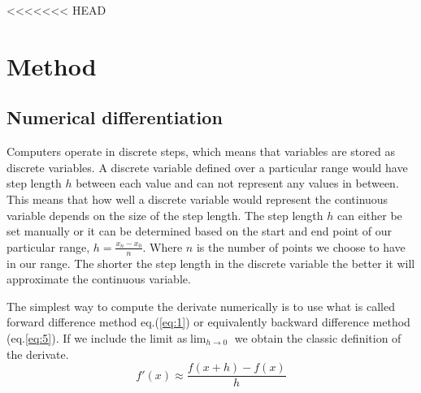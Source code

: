 <<<<<<< HEAD
\section*{Method}
\subsection*{Numerical differentiation}
\par Computers operate in discrete steps, which means that variables are stored
as discrete variables. A discrete variable defined over a particular range would
have step length $h$ between each value and can not represent any values in
between. This means that how well a discrete variable would represent the
continuous variable depends on the size of the step length. The step length $h$
can either be set manually or it can be determined based on the start and end
point of our particular range, $h = \frac{x_n -x_0}{n}$. Where $n$ is the number
of points we choose to have in our range. The shorter the step length in the
discrete variable the better it will approximate the continuous variable.
\par
The simplest way to compute the derivate numerically is to use what is called
forward difference method eq.(\ref{eq:1}) or equivalently backward difference
method (eq.\ref{eq:5}). If we include the limit as$\lim_{h\to 0}$ we obtain the
classic definition of the derivate.
\begin{equation}\label{eq:1}
    f'(x) \approx \frac{f(x+h)-f(x)}{h}
\end{equation}


